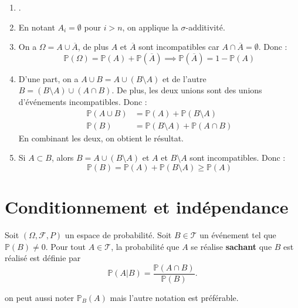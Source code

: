\documentclass[a4paper,12pt]{article}
\begin{document}
\begin{demonstration}
    \begin{enumerate}[label=(\roman*)]
        \item.
        \item En notant $A_i = \emptyset$ pour $i > n$, on applique la $\sigma$-additivité.
        \item On a $\Omega = A \cup \overline{A}$, de plus $A$ et $\overline{A}$ sont incompatibles car $A \cap \overline{A} = \emptyset$.
        Donc :
        $$
        \mathbb{P}(\Omega) = \mathbb{P}(A) + \mathbb{P}(\overline{A}) \implies \mathbb{P}(\overline{A}) = 1 - \mathbb{P}(A)
        $$
        \item D'une part, on a $A \cup B = A \cup (B \setminus A)$ et de l'autre $B = (B \setminus A) \cup (A \cap B)$.
        De plus, les deux unions sont des unions d'événements incompatibles.
        Donc :
        \begin{align*}
            \mathbb{P}(A \cup B) &= \mathbb{P}(A) + \mathbb{P}(B \setminus A) \\
            \mathbb{P}(B) &= \mathbb{P}(B \setminus A) + \mathbb{P}(A \cap B)
        \end{align*}
        En combinant les deux, on obtient le résultat.
        \item Si $A \subset B$, alors $B = A \cup (B \setminus A)$ et $A$ et $B \setminus A$ sont incompatibles.
        Donc :
        $$
        \mathbb{P}(B) = \mathbb{P}(A) + \mathbb{P}(B \setminus A) \geq \mathbb{P}(A)
        $$
    \end{enumerate}
    
\end{demonstration}

\clearpage

\section{Conditionnement et indépendance}

\begin{definition}
    Soit \((\Omega, \mathcal{F}, P)\) un espace de probabilité. Soit $B \in \mathcal{T}$
    un événement tel que $\mathbb{P}(B) \neq 0$.
    Pour tout $A \in \mathcal{T}$, la probabilité que $A$ se réalise \textbf{sachant} que $B$ est réalisé est définie par
    $$
    \mathbb{P}(A|B) = \frac{\mathbb{P}(A \cap B)}{\mathbb{P}(B)}.
    $$
\end{definition}

\begin{remarque}
    on peut aussi noter $\mathbb{P}_B(A)$ mais l'autre notation est préférable.
\end{remarque}
\end{document}
